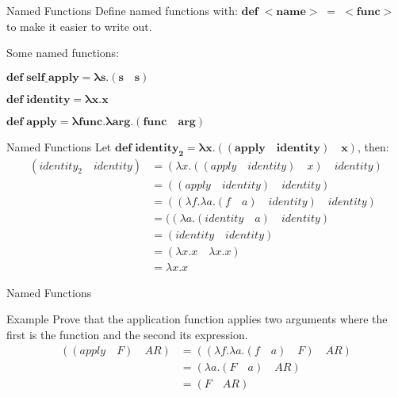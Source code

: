 \documentclass{beamer}
\begin{document}
\begin{frame}{Named Functions}
Define named functions with: $\mathbf{def\;<name>\;=\;<func>}$ to make it easier to write out.
\begin{block}{Some named functions:}
	\begin{framed} $\mathbf{def \; self\_apply = \lambda s . (s \quad s)}$ \end{framed}
  	\begin{framed} $\mathbf{def \; identity = \lambda x . x}$ \end{framed}
   	\begin{framed} $\mathbf{def \; apply = \lambda func . \lambda arg . (func \quad arg)}$ \end{framed}
\end{block}
\end{frame}

\begin{frame}{Named Functions}
Let $\mathbf{def \; identity_2 = \lambda x . ((apply \quad identity)  \quad x)}$, then:
  \begin{align*}
      (identity_2 \quad identity) &= (\lambda x . (( apply \quad identity) \quad x ) \quad identity) \\
      &= ((apply \quad identity) \quad identity) \\
      &= ((\lambda f . \lambda a . (f \quad a) \quad identity) \quad identity) \\
      &= ((\lambda a . (identity \quad a) \quad identity) \\
      &= (identity \quad identity) \\
      &= (\lambda x . x \quad \lambda x . x) \\
      &= \lambda x . x
  \end{align*}
\end{frame}

\begin{frame}{Named Functions}
\begin{block}{Example}
Prove that the application function applies two arguments where the first is the function and the second its expression.
	\begin{align*}
    	((apply \quad F) \quad AR) &= ((\lambda f . \lambda a . (f \quad a) \quad F) \quad AR) \\
        &= (\lambda a . (F \quad a) \quad AR) \\
        &= (F \quad AR)
    \end{align*}
\end{block}
\end{frame}
\end{document}
